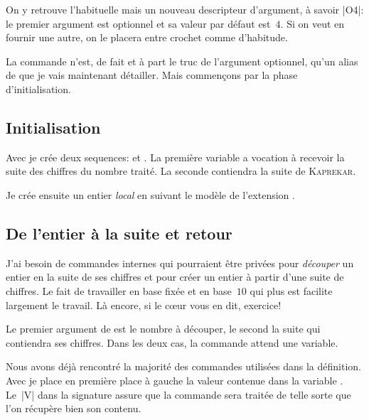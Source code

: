 On y retrouve l'habituelle  mais un nouveau
descripteur d'argument, à savoir |O{4}|: le premier argument est
optionnel et sa valeur par défaut est~\(4\). Si on veut en fournir une
autre, on le placera entre crochet comme d'habitude.

La commande n'est, de fait et à part le truc de l'argument optionnel,
qu'un alias de  que je vais
maintenant détailler. Mais commençons par la phase d'initialisation.

\subsection{Initialisation}
\label{sec:kaprinit}


Avec  je crée deux \glspl{sequence}: 
et . La première \gls{variable} a vocation à
recevoir la suite des chiffres du nombre traité. La seconde contiendra
la suite de \textsc{Kaprekar}.

Je crée ensuite un \gls{entier} \emph{local} en suivant le modèle
de l'extension .

\subsection{De l'entier à la suite et retour}
\label{sec:entiersuiteretour}

J'ai besoin de commandes internes \TO qui pourraient être privées\TF
pour \emph{découper} un entier en la suite de ses chiffres et pour
créer un entier à partir d'une suite de chiffres. Le fait de
travailler en base fixée \TO et en base~\(10\) qui plus est\TF
facilite largement le travail. Là encore, si le cœur vous en dit,
exercice!


Le premier argument de  est le nombre à
découper, le second la suite qui contiendra ses chiffres. Dans les
deux cas, la commande attend une \gls{variable}.

Nous avons déjà rencontré la majorité des commandes utilisées dans la
définition. Avec  je place en première place
\TO à gauche \TF la valeur contenue dans la
\gls{variable} . Le~|V| dans la signature assure que
la commande  sera traitée de telle sorte que l'on
récupère bien son contenu.

